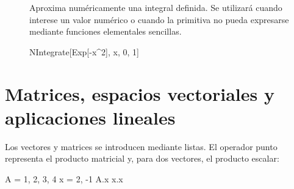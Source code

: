\begin{description}
\item[] Aproxima numéricamente una integral definida. Se utilizará cuando interese un valor numérico o cuando la primitiva no pueda expresarse mediante funciones elementales sencillas.
\begin{mathematicacode}
NIntegrate[Exp[-x^2], {x, 0, 1}]
\end{mathematicacode}

\end{description}

\section*{Matrices, espacios vectoriales y aplicaciones lineales}

Los vectores y matrices se introducen mediante listas. El operador punto  representa el producto matricial y, para dos vectores, el producto escalar:
\begin{mathematicacode}
A = {{1, 2}, {3, 4}}
x = {2, -1}
A.x
x.x
\end{mathematicacode}

